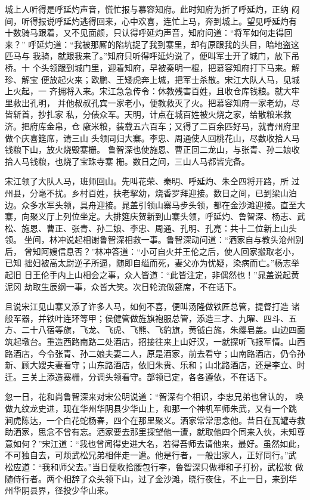 城上人听得是呼延灼声音，慌忙报与慕容知府。此时知府为折了呼延灼，正纳
闷间，听得报说呼延灼逃得回来，心中欢喜，连忙上马，奔到城上。望见呼延灼有
十数骑马跟着，又不见面颜，只认得呼延灼声音，知府问道：“将军如何走得回来？”
呼延灼道：“我被那厮的陷坑捉了我到寨里，却有原跟我的头目，暗地盗这匹马与
我骑，就跟我来了。”知府只听得呼延灼说了，便叫军士开了城门，放下吊桥。十
个头领跟到城门里，迎着知府，早被秦明一棍，把慕容知府打下马来。解珍、解宝
便放起火来；欧鹏、王矮虎奔上城，把军士杀散。宋江大队人马，见城上火起，一
齐拥将入来。宋江急急传令：休教残害百姓，且收仓库钱粮。就大牢里救出孔明，
并他叔叔孔宾一家老小，便教救灭了火。把慕容知府一家老幼，尽皆斩首，抄扎家
私，分俵众军。天明，计点在城百姓被火烧之家，给散粮米救济。把府库金帛，仓
廒米粮，装载五六百车；又得了二百余匹好马，就青州府里做个庆喜筵席，请三山
头领同归大寨。李忠、周通使人回桃花山，尽数收拾人马钱粮下山，放火烧毁寨栅。
鲁智深也使施恩、曹正回二龙山，与张青、孙二娘收拾人马钱粮，也烧了宝珠寺寨
栅。数日之间，三山人马都皆完备。

宋江领了大队人马，班师回山。先叫花荣、秦明、呼延灼、朱仝四将开路，所
过州县，分毫不扰。乡村百姓，扶老挈幼，烧香罗拜迎接。数日之间，已到梁山泊
边。众多水军头领，具舟迎接。晁盖引领山寨马步头领，都在金沙滩迎接。直至大
寨，向聚义厅上列位坐定。大排筵庆贺新到山寨头领，呼延灼、鲁智深、杨志、武
松、施恩、曹正、张青、孙二娘、李忠、周通、孔明、孔亮：共十二位新上山头领。
坐间，林冲说起相谢鲁智深相救一事。鲁智深动问道：“洒家自与教头沧州别后，
曾知阿嫂信息否？”林冲答道：“小可自火并王伦之后，使人回家搬取老小，已知
拙妇被高太尉逆子所逼，随即自缢而死，妻父亦为忧疑，染病而亡。”杨志举起旧
日王伦手内上山相会之事，众人皆道：“此皆注定，非偶然也！”晁盖说起黄泥冈
劫取生辰纲一事，众皆大笑。次日轮流做筵席，不在话下。

且说宋江见山寨又添了许多人马，如何不喜，便叫汤隆做铁匠总管，提督打造
诸般军器，并铁叶连环等甲；侯健管做旌旗袍服总管，添造三才、九曜、四斗、五
方、二十八宿等旗，飞龙、飞虎、飞熊、飞豹旗，黄钺白旄，朱缨皂盖。山边四面
筑起墩台。重造西路南路二处酒店，招接往来上山好汉，一就探听飞报军情。山西
路酒店，今令张青、孙二娘夫妻二人，原是酒家，前去看守；山南路酒店，仍令孙
新、顾大嫂夫妻看守；山东路酒店，依旧朱贵、乐和；山北路酒店，还是李立、时
迁。三关上添造寨栅，分调头领看守。部领已定，各各遵依，不在话下。

忽一日，花和尚鲁智深来对宋公明说道：“智深有个相识，李忠兄弟也曾认的，
唤做九纹龙史进，现在华州华阴县少华山上，和那一个神机军师朱武，又有一个跳
涧虎陈达，一个白花蛇杨春，四个在那里聚义。洒家常常思念他。昔日在瓦罐寺救
助洒家，思念不曾有忘。洒家要去那里探望他一遭，就取他四个同来入伙，未知尊
意如何？”宋江道：“我也曾闻得史进大名，若得吾师去请他来，最好。虽然如此，
不可独自去，可烦武松兄弟相伴走一遭。他是行者，一般出家人，正好同行。”武
松应道：“我和师父去。”当日便收拾腰包行李，鲁智深只做禅和子打扮，武松妆
做随侍行者。两个相辞了众头领下山，过了金沙滩，晓行夜住，不止一日，来到华
州华阴县界，径投少华山来。

